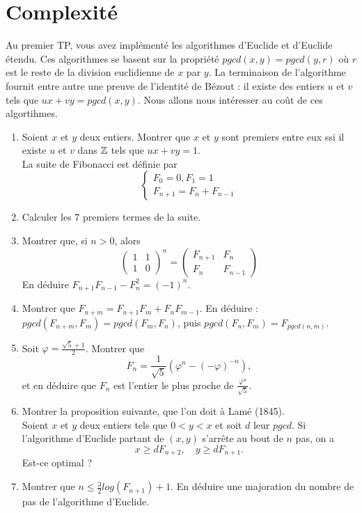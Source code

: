 \section{Complexité}

Au premier TP, vous avez implémenté les algorithmes d'Euclide et d'Euclide étendu. Ces algorithmes se basent sur la propriété $pgcd(x,y)=pgcd(y,r)$ où $r$ est le reste de la division euclidienne de $x$ par $y$. La terminaison de l'algorithme fournit entre autre une preuve de l'identité de Bézout : il existe des entiers $u$ et $v$ tels que $ux+vy=pgcd(x,y)$. Nous allons nous intéresser au coût de ces algortihmes.

\begin{enumerate}
\item Soient $x$ et $y$ deux entiers. Montrer que $x$ et $y$ sont premiers entre eux ssi il existe $u$ et $v$ dans $\mathbb Z$ tels que $ux+vy=1$.\\ 

La suite de Fibonacci est définie par 
\[\left\{\begin{array}{c} F_0 = 0, F_1 = 1\\
F_{n+1}=F_n+F_{n-1}\end{array}\right.\]

\item Calculer les $7$ premiers termes de la suite.
\item Montrer que, si $n>0$, alors 
\[\begin{pmatrix}1 & 1 \\ 1 & 0\end{pmatrix}^n = \begin{pmatrix}F_{n+1} & F_n \\ F_n & F_{n-1}\end{pmatrix}\]
En déduire $F_{n+1}F_{n-1}-F_n^2 = (-1)^n$.
\item Montrer que $F_{n+m} = F_{n+1}F_m+F_n F_{m-1}$. En déduire : $pgcd(F_{n+m},F_m)= pgcd(F_m,F_n)$, puis $pgcd(F_n,F_m)=F_{pgcd(n,m)}$.
\item Soit $\varphi = \frac{\sqrt{5}+1}{2}$. Montrer que 
\[F_n= \frac{1}{\sqrt{5}}(\varphi^n-(-\varphi)^{-n}),\]
et en déduire que $F_n$ est l'entier le plus proche de $\frac{\varphi^n}{\sqrt 5}$.
\item Montrer la proposition suivante, que l'on doit à Lamé (1845). \\
Soient $x$ et $y$ deux entiers tels que $0<y<x$ et soit $d$ leur $pgcd$. Si l'algorithme d'Euclide partant de $(x,y)$ s'arrête au bout de $n$ pas, on a 
\[x \geq d F_{n+2}, \quad y \geq d F_{n+1}.\]
Est-ce optimal ?
\item Montrer que $n\leq \frac{3}{2} log (F_{n+1})+1$. En déduire une majoration du nombre de pas de l'algorithme d'Euclide.\\


\end{enumerate}

